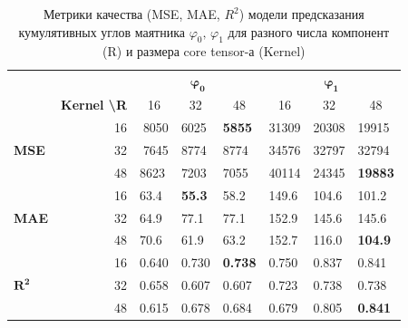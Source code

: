 \documentclass[a4paper,14pt]{article}
\theoremstyle{plain} %
\theoremstyle{definition} %
\theoremstyle{remark} %
\begin{document}
	\begin{table}[]
		\begin{tabular}{lr|lll|lll|}
			\cline{3-8}
			& \multicolumn{1}{l|}{} & \multicolumn{3}{c|}{$\mathbf{\varphi_0}$} & \multicolumn{3}{c|}{$\mathbf{\varphi_1}$} \\ \cline{2-8} 
			\multicolumn{1}{l|}{} & \multicolumn{1}{l|}{\textbf{Kernel \textbackslash R}} & \multicolumn{1}{c|}{16} & \multicolumn{1}{c|}{32} & \multicolumn{1}{c|}{48} & \multicolumn{1}{c|}{16} & \multicolumn{1}{c|}{32} & \multicolumn{1}{c|}{48} \\ \hline
			\multicolumn{1}{|l|}{\multirow{3}{*}{\textbf{MSE}}} & 16 & \multicolumn{1}{r|}{8050} & \multicolumn{1}{l|}{6025} & \textbf{5855} & \multicolumn{1}{l|}{31309} & \multicolumn{1}{l|}{20308} & 19915 \\ \cline{2-8} 
			\multicolumn{1}{|l|}{} & 32 & \multicolumn{1}{r|}{7645} & \multicolumn{1}{l|}{8774} & 8774 & \multicolumn{1}{l|}{34576} & \multicolumn{1}{l|}{32797} & 32794 \\ \cline{2-8} 
			\multicolumn{1}{|l|}{} & 48 & \multicolumn{1}{l|}{8623} & \multicolumn{1}{l|}{7203} & 7055 & \multicolumn{1}{l|}{40114} & \multicolumn{1}{l|}{24345} & \textbf{19883} \\ \hline
			\multicolumn{1}{|l|}{\multirow{3}{*}{\textbf{MAE}}} & 16 & \multicolumn{1}{l|}{63.4} & \multicolumn{1}{l|}{\textbf{55.3}} & 58.2 & \multicolumn{1}{l|}{149.6} & \multicolumn{1}{l|}{104.6} & 101.2 \\ \cline{2-8} 
			\multicolumn{1}{|l|}{} & 32 & \multicolumn{1}{l|}{64.9} & \multicolumn{1}{l|}{77.1} & 77.1 & \multicolumn{1}{l|}{152.9} & \multicolumn{1}{l|}{145.6} & 145.6 \\ \cline{2-8} 
			\multicolumn{1}{|l|}{} & 48 & \multicolumn{1}{l|}{70.6} & \multicolumn{1}{l|}{61.9} & 63.2 & \multicolumn{1}{l|}{152.7} & \multicolumn{1}{l|}{116.0} & \textbf{104.9} \\ \hline
			\multicolumn{1}{|l|}{\multirow{3}{*}{$\mathbf{R^2}$}} & 16 & \multicolumn{1}{l|}{0.640} & \multicolumn{1}{l|}{0.730} & \textbf{0.738} & \multicolumn{1}{l|}{0.750} & \multicolumn{1}{l|}{0.837} & 0.841 \\ \cline{2-8} 
			\multicolumn{1}{|l|}{} & 32 & \multicolumn{1}{l|}{0.658} & \multicolumn{1}{l|}{0.607} & 0.607 & \multicolumn{1}{l|}{0.723} & \multicolumn{1}{l|}{0.738} & 0.738 \\ \cline{2-8} 
			\multicolumn{1}{|l|}{} & 48 & \multicolumn{1}{l|}{0.615} & \multicolumn{1}{l|}{0.678} & 0.684 & \multicolumn{1}{l|}{0.679} & \multicolumn{1}{l|}{0.805} & \textbf{0.841} \\ \hline
		\end{tabular}
		\label{tbl:grid_search_metrics}
		\caption{Метрики качества (MSE, MAE, $R^2$) модели предсказания кумулятивных углов маятника $\varphi_0, \, \varphi_1$ для разного числа компонент (R) и размера core tensor-а (Kernel)}
	\end{table}
\end{document}
